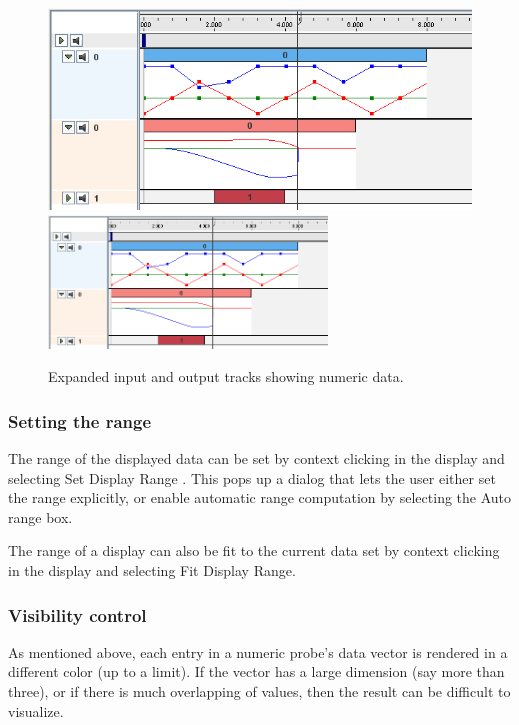 \documentclass{article}
\begin{document}
\begin{figure}
\begin{center}
\iflatexml
\includegraphics[]{images/numericDisplay}
\else
\includegraphics[width=0.66\textwidth]{images/numericDisplay}
\fi
\end{center}
\caption{Expanded input and output tracks showing numeric data.}%
\label{numericDisplayFig}
\end{figure}

\subsubsection{Setting the range}

The range of the displayed data can be set by context clicking in the
display and selecting {\sf Set Display Range} . This pops up a dialog that
lets the user either set the range explicitly, or enable automatic
range computation by selecting the {\sf Auto range} box.

The range of a display can also be fit to the current data
set by context clicking in the display and selecting {\sf Fit Display Range}.

\subsubsection{Visibility control}

As mentioned above, each entry in a numeric probe's data vector is
rendered in a different color (up to a limit).  If the vector has a
large dimension (say more than three), or if there is much overlapping
of values, then the result can be difficult to visualize.
\end{document}
